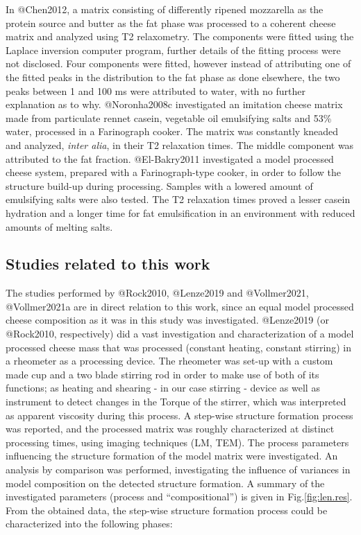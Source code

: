 \documentclass[
]{article}
\begin{document}
In @Chen2012, a matrix consisting of differently ripened mozzarella as
the protein source and butter as the fat phase was processed to a
coherent cheese matrix and analyzed using T2 relaxometry. The components
were fitted using the Laplace inversion computer program, further
details of the fitting process were not disclosed. Four components were
fitted, however instead of attributing one of the fitted peaks in the
distribution to the fat phase as done elsewhere, the two peaks between 1
and 100 ms were attributed to water, with no further explanation as to
why. @Noronha2008c investigated an imitation cheese matrix made from
particulate rennet casein, vegetable oil emulsifying salts and 53\%
water, processed in a Farinograph cooker. The matrix was constantly
kneaded and analyzed, \emph{inter alia}, in their T2 relaxation times.
The middle component was attributed to the fat fraction. @El-Bakry2011
investigated a model processed cheese system, prepared with a
Farinograph-type cooker, in order to follow the structure build-up
during processing. Samples with a lowered amount of emulsifying salts
were also tested. The T2 relaxation times proved a lesser casein
hydration and a longer time for fat emulsification in an environment
with reduced amounts of melting salts.

\subsection{Studies related to this work}

The studies performed by @Rock2010, @Lenze2019 and @Vollmer2021,
@Vollmer2021a are in direct relation to this work, since an equal model
processed cheese composition as it was in this study was investigated.
@Lenze2019 (or @Rock2010, respectively) did a vast investigation and
characterization of a model processed cheese mass that was processed
(constant heating, constant stirring) in a rheometer as a processing
device. The rheometer was set-up with a custom made cup and a two blade
stirring rod in order to make use of both of its functions; as heating
and shearing - in our case stirring - device as well as instrument to
detect changes in the Torque of the stirrer, which was interpreted as
apparent viscosity during this process. A step-wise structure formation
process was reported, and the processed matrix was roughly characterized
at distinct processing times, using imaging techniques (LM, TEM). The
process parameters influencing the structure formation of the model
matrix were investigated. An analysis by comparison was performed,
investigating the influence of variances in model composition on the
detected structure formation. A summary of the investigated parameters
(process and ``compositional'') is given in Fig.\ref{fig:len.res}. From
the obtained data, the step-wise structure formation process could be
characterized into the following phases:
\end{document}
